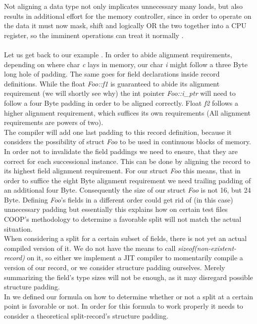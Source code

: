 Not aligning a data type not only implicates unnecessary many loads, but also results in additional effort for the memory controller, since in order to operate on the data it must now mask, shift and logically OR the two together into a CPU register, so the imminent operations can treat it normally .\\\\
Let us get back to our example . In order to abide alignment requirements, depending on where char \textit{c} lays in memory, our char \textit{i} might follow a three Byte long hole of padding. The same goes for field declarations inside record definitions. While the float \textit{Foo::f1} is guaranteed to abide its alignment requirement (we will shortly see why) the int pointer \textit{Foo::i\_ptr} will need to follow a four Byte padding in order to be aligned correctly. Float \textit{f2} follows a higher alignment requirement, which suffices its own requirements (All alignment requirements are powers of two).\\
The compiler will add one last padding to this record definition, because it considers the possibility of struct \textit{Foo} to be used in continuous blocks of memory. In order not to invalidate the field paddings we need to ensure, that they are correct for each successional instance. This can be done by aligning the record to its highest field alignment requirement. For our struct \textit{Foo} this means, that in order to suffice the eight Byte alignment requirement we need trailing padding of an additional four Byte. Consequently the size of our struct \textit{Foo} is not 16, but 24 Byte. Defining \textit{Foo}'s fields in a different order could get rid of (in this case) unnecessary padding but essentially this explains how on certain test files COOP's methodology to determine a favorable split will not match the actual situation.\\
When considering a split for a certain subset of fields, there is not yet an actual compiled version of it. We do not have the means to call \textit{sizeof(non-existent-record)} on it, so either we implement a JIT compiler to momentarily compile a version of our record, or we consider structure padding ourselves. Merely summarizing the field's type sizes will not be enough, as it may disregard possible structure padding.\\
In  we defined our formula on how to determine whether or not a split at a certain point is favorable or not. In order for this formula to work properly it needs to consider a theoretical split-record's structure padding.\\
